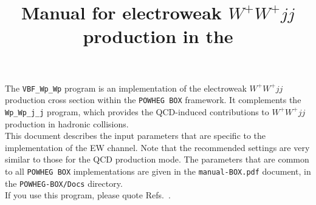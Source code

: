 \documentclass[a4paper,11pt]{article}
\title{Manual for electroweak $W^+W^+ jj$ production in the \POWHEGBOX{}}
\date{}
\def\pbox{{\tt POWHEG BOX}}
\begin{document}
\maketitle
%
\noindent
The {\tt VBF\_Wp\_Wp} program is an implementation of the electroweak
$W^+W^+ jj$ production cross section within the \pbox{} framework. It
complements the {\tt Wp\_Wp\_j\_j} program, which provides the
QCD-induced contributions to $W^+W^+ jj$ production in hadronic
collisions.
\\[2ex]
This document describes the input parameters that are specific to the
implementation of the EW channel. Note that the recommended settings
are very similar to those for the QCD production mode.  The parameters
that are common to all {\tt POWHEG BOX} implementations are given in
the {\tt manual-BOX.pdf} document, in the {\tt POWHEG-BOX/Docs}
directory.
\\[2ex]
If you use this program, please quote
Refs.~\cite{Jager:2009xx,JZ,Alioli:2010xd}.
\end{document}
